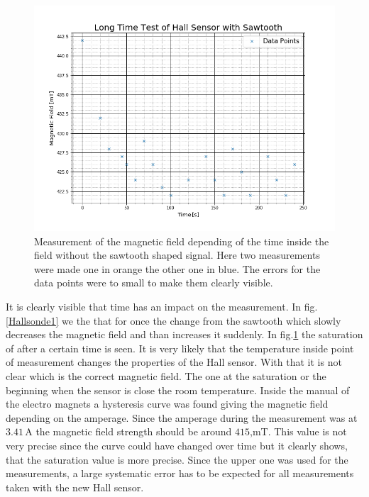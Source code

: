 \begin{figure}[ht]
	\includegraphics[scale=0.5]{Bild/Hallsonde2}
	\centering
	\caption{Measurement of the magnetic field depending of the time inside the field without the sawtooth shaped signal. Here two measurements were made one in orange the other one in blue. The errors for the data points were to small to make them clearly visible.}
	\label{Hallsonde2}
\end{figure}
It is clearly visible that time has an impact on the measurement. In fig.\ref{Hallsonde1} we the that for once the change from the sawtooth which slowly decreases the magnetic field and than increases it suddenly. In fig.\ref{Hallsonde2} the saturation of after a certain time is seen. It is very likely that the temperature inside point of measurement changes the properties of the Hall sensor. With that it is not clear which is the correct magnetic field. The one at the saturation or the beginning when the sensor is close the room temperature. Inside the manual of the electro magnets a hysteresis curve was found giving the magnetic field depending on the amperage.\cite{Electromagnet} Since the amperage during the measurement was at $3.41$\,A the magnetic field strength should be around $415$,mT. This value is not very precise since the curve could have changed over time but it clearly shows, that the saturation value is more precise. Since the upper one was used for the measurements, a large systematic error has to be expected for all measurements taken with the new Hall sensor.